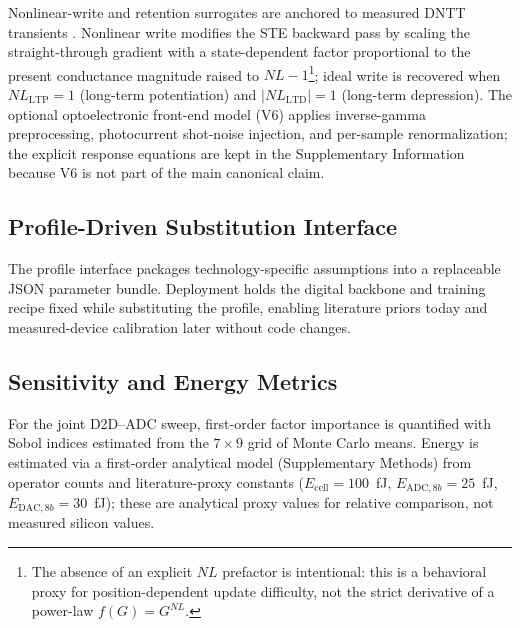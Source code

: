 Nonlinear-write and retention surrogates are anchored to measured DNTT transients \citep{vincze2025dualplasticity}. Nonlinear write modifies the STE backward pass by scaling the straight-through gradient with a state-dependent factor proportional to the present conductance magnitude raised to $NL-1$\footnote{The absence of an explicit $NL$ prefactor is intentional: this is a behavioral proxy for position-dependent update difficulty, not the strict derivative of a power-law $f(G)=G^{NL}$.}; ideal write is recovered when $NL_{\mathrm{LTP}}=1$ (long-term potentiation) and $|NL_{\mathrm{LTD}}|=1$ (long-term depression). The optional optoelectronic front-end model (V6) applies inverse-gamma preprocessing, photocurrent shot-noise injection, and per-sample renormalization; the explicit response equations are kept in the Supplementary Information because V6 is not part of the main canonical claim.

\subsection{Profile-Driven Substitution Interface}
\label{subsec:profile-interface}

The profile interface packages technology-specific assumptions into a replaceable JSON parameter bundle. Deployment holds the digital backbone and training recipe fixed while substituting the profile, enabling literature priors today and measured-device calibration later without code changes.

\subsection{Sensitivity and Energy Metrics}
\label{subsec:sensitivity-energy}

For the joint D2D--ADC sweep, first-order factor importance is quantified with Sobol indices estimated from the $7 \times 9$ grid of Monte Carlo means. Energy is estimated via a first-order analytical model (Supplementary Methods) from operator counts and literature-proxy constants ($E_{\text{cell}}=100$~fJ, $E_{\text{ADC},8b}=25$~fJ, $E_{\text{DAC},8b}=30$~fJ); these are analytical proxy values for relative comparison, not measured silicon values.
